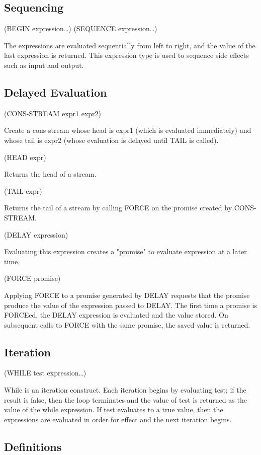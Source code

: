 \documentclass[11pt]{article}
\begin{document}
\subsection{Sequencing}
\label{sec-1-9}

(BEGIN expression\ldots{})
(SEQUENCE expression\ldots{})

The expressions are evaluated sequentially from left to right, and the
value of the last expression is returned. This expression type is used
to sequence side effects such as input and output.
\subsection{Delayed Evaluation}
\label{sec-1-10}

(CONS-STREAM expr1 expr2)

Create a cons stream whose head is expr1 (which is evaluated
immediately) and whose tail is expr2 (whose evaluation is delayed until
TAIL is called).

(HEAD expr)

Returns the head of a stream.

(TAIL expr)

Returns the tail of a stream by calling FORCE on the promise created by
CONS-STREAM.

(DELAY expression)

Evaluating this expression creates a "promise" to evaluate expression at
a later time.

(FORCE promise)

Applying FORCE to a promise generated by DELAY requests that the promise
produce the value of the expression passed to DELAY. The first time a
promise is FORCEed, the DELAY expression is evaluated and the value
stored. On subsequent calls to FORCE with the same promise, the saved
value is returned.
\subsection{Iteration}
\label{sec-1-11}

(WHILE test expression\ldots{})

While is an iteration construct. Each iteration begins by evaluating
test; if the result is false, then the loop terminates and the value of
test is returned as the value of the while expression. If test evaluates
to a true value, then the expressions are evaluated in order for effect
and the next iteration begins.
\subsection{Definitions}
\label{sec-1-12}
\end{document}
